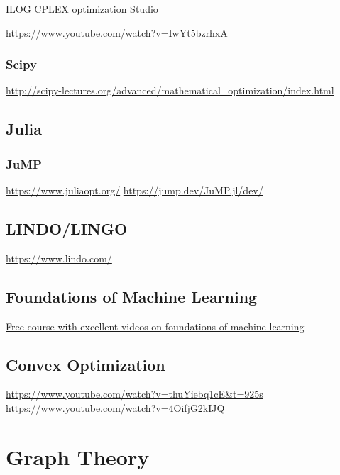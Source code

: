 \documentclass[letter,12pt]{book}
\renewcommand{\0}{\mathbf{0}}
\begin{document}
ILOG CPLEX optimization Studio

\url{https://www.youtube.com/watch?v=IwYt5bzrhxA}



\subsection{Scipy}

\url{http://scipy-lectures.org/advanced/mathematical_optimization/index.html}

\section{Julia}
\subsection{JuMP}
\url{https://www.juliaopt.org/}
\url{https://jump.dev/JuMP.jl/dev/}

\section{LINDO/LINGO}
\url{https://www.lindo.com/}

\section{Foundations of Machine Learning}
\href{https://bloomberg.github.io/foml/#home}{Free course with excellent videos on foundations of machine learning}
\section{Convex Optimization}
\url{https://www.youtube.com/watch?v=thuYiebq1cE&t=925s}
\url{https://www.youtube.com/watch?v=4OifjG2kIJQ}

\chapter{Graph Theory}

\end{document}
